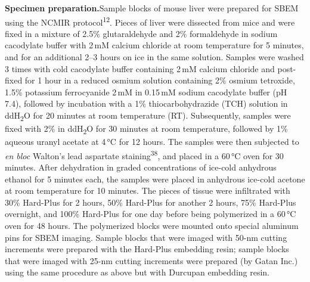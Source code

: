 \documentclass{article}
\newcommand{\cit}[1]{\textsuperscript{#1}}
\begin{document}
\medskip
\noindent\textbf{Specimen preparation.}\quad Sample blocks of mouse liver were prepared for SBEM using the NCMIR protocol\cit{12}. Pieces of liver were dissected from mice and were fixed in a mixture of 2.5\% glutaraldehyde and 2\% formaldehyde in sodium cacodylate buffer with 2\,mM calcium chloride at room temperature for 5 minutes, and for an additional 2–3 hours on ice in the same solution. Samples were washed 3 times with cold cacodylate buffer containing 2\,mM calcium chloride and post-fixed for 1 hour in a reduced osmium solution containing 2\% osmium tetroxide, 1.5\% potassium ferrocyanide 2\,mM  in 0.15\,mM sodium cacodylate buffer (pH 7.4), followed by incubation with a 1\% thiocarbohydrazide (TCH) solution in ddH\textsubscript{2}O for 20 minutes at room temperature (RT). Subsequently, samples were fixed with 2\%  in ddH\textsubscript{2}O for 30 minutes at room temperature, followed by 1\% aqueous uranyl acetate at 4\,°C for 12 hours. The samples were then subjected to \emph{en bloc} Walton’s lead aspartate staining\cit{38}, and placed in a 60\,°C oven for 30 minutes. After dehydration in graded concentrations of ice-cold anhydrous ethanol for 5 minutes each, the samples were placed in anhydrous ice-cold acetone at room temperature for 10 minutes. The pieces of tissue were infiltrated with 30\% Hard-Plus for 2 hours, 50\% Hard-Plus for another 2 hours, 75\% Hard-Plus overnight, and 100\% Hard-Plus for one day before being polymerized in a 60\,°C oven for 48 hours. The polymerized blocks were mounted onto special aluminum pins for SBEM imaging. Sample blocks that were imaged with 50-nm cutting increments were prepared with the Hard-Plus embedding resin; sample blocks that were imaged with 25-nm cutting increments were prepared (by Gatan Inc.) using the same procedure as above but with Durcupan embedding resin.
\end{document}
